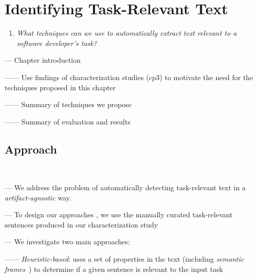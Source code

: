 \setcounter{chapter}{4}
\setcounter{rq}{1}


\chapter{Identifying Task-Relevant Text}
\label{ch:identifying}



\vspace{1mm}

\begin{enumerate}[label=\textit{RQ\arabic*},leftmargin=1.4cm]

\item \textit{What techniques can we use to automatically extract text relevant to a software developer's task?} 

\end{enumerate}

\vspace{1mm}

--- Chapter introduction 

------ Use findings of characterization studies (cp3) to motivate the need for the techniques proposed in this chapter

------ Summary of techniques we propose


------ Summary of evaluation and results



\clearpage


\section{Approach}
\textcolor{white}{force ident} %

--- We address  the problem of automatically detecting task-relevant text in a \textit{artifact-agnostic} way. \vspace{3mm}

--- To design our approaches , we use the manually curated task-relevant sentences produced in our characterization study~\cite{marques2020} \vspace{3mm}

--- We investigate two main approaches:

------ \textit{Heuristic-based}: uses a set of properties in the text (including \textit{semantic frames}~\cite{fillmore1976frame}) to determine if a given sentence is relevant to the input task

